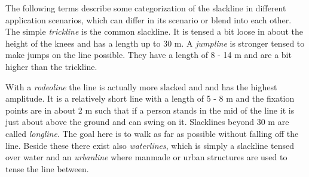 The following terms describe some categorization of the slackline in different application scenarios, which can differ in its scenario or blend into each other. The simple \textit{trickline} is the common slackline. It is tensed a bit loose in about the height of the knees and has a length up to 30 m. A \textit{jumpline} is stronger tensed to make jumps on the line possible. They have a length of 8 - 14 m and are a bit higher than the trickline. 

With a \textit{rodeoline} the line is actually more slacked and and has the highest amplitude. It is a relatively short line with a length of 5 - 8 m and the fixation points are in about 2 m such that if a person stands in the mid of the line it is just about above the ground and can swing on it. Slacklines beyond 30 m are called \textit{longline}. The goal here is to walk as far as possible without falling off the line. Beside these there exist also \textit{waterlines}, which is simply a slackline tensed over water and an \textit{urbanline} where manmade or urban structures are used to tense the line between.
